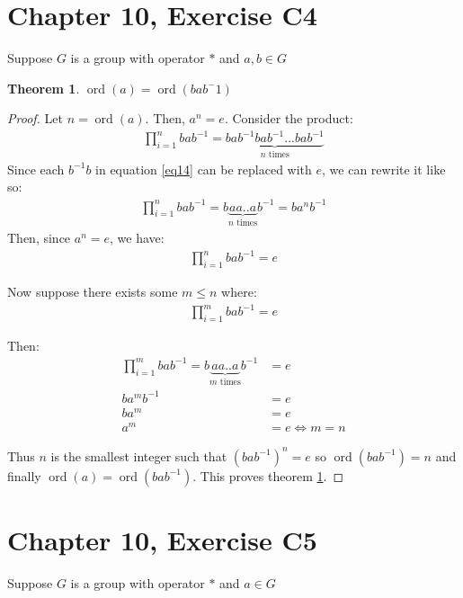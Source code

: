 \documentclass[12pt]{article}
\newcommand{\ord}{\operatorname{ord}}
\newtheorem{thm}{Theorem}
\begin{document}
\section{Chapter 10, Exercise C4}

Suppose $G$ is a group with operator $*$ and $a,b \in G$

\begin{thm} \label{thm8}
	$\ord(a) = \ord(bab^-1)$
\end{thm}

\begin{proof}
	Let $n = \ord(a)$.
	Then, $a^n = e$.
	Consider the product:
	\begin{align} \label{eq14}
	\prod_{i=1}^n bab^{-1}  = \underbrace{bab^{-1} bab^{-1} ... bab^{-1}}_\text{$n$ times}
	\end{align}
	Since each $b^{-1}b$ in equation \ref{eq14} can be replaced with $e$,
	we can rewrite it like so:
	\begin{align} \label{eq15}
		\prod_{i=1}^n bab^{-1}  = b\underbrace{aa .. a}_\text{$n$ times}b^{-1}
		= ba^nb^{-1}
	\end{align}
	Then, since $a^n = e$, we have:
	\begin{align} \label{eq16}
		\prod_{i=1}^n bab^{-1} = e
	\end{align}

	Now suppose there exists some $m \le n$ where:
	\begin{align} \label{eq17}
		\prod_{i=1}^m bab^{-1} = e
	\end{align}

	Then:
	\begin{align} \label{eq18}
		\prod_{i=1}^m bab^{-1}  = b\underbrace{aa .. a}_\text{$m$ times}b^{-1} & = e \\
		ba^mb^{-1} & = e \\
		ba^m & = e \\
		a^m & = e \iff m = n
	\end{align}

	Thus $n$ is the smallest integer such that $(bab^{-1})^n = e$
	so $\ord(bab^{-1}) = n$ and finally $\ord(a) = \ord(bab^{-1})$.
	This proves theorem \ref{thm8}.

\end{proof}

\section{Chapter 10, Exercise C5}

Suppose $G$ is a group with operator $*$ and $a\in G$
\end{document}
